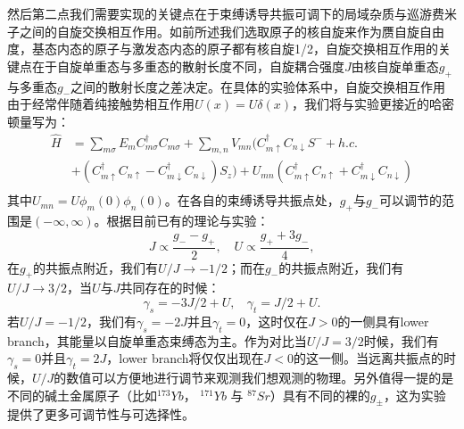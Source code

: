 然后第二点我们需要实现的关键点在于束缚诱导共振可调下的局域杂质与巡游费米子之间的自旋交换相互作用\cite{ono2019antiferromagnetic,zhang2016kondo,cheng2017enhancing,zhang2018control,ji2018confinement,zhang2020tight}。如前所述我们选取原子的核自旋来作为赝自旋自由度，基态内态的原子与激发态内态的原子都有核自旋1/2，自旋交换相互作用的关键点在于自旋单重态与多重态的散射长度不同，自旋耦合强度$J$由核自旋单重态$g_+$与多重态$g_-$之间的散射长度之差决定\cite{scazza2014observation,cappellini2014direct,ono2019antiferromagnetic}。在具体的实验体系中，自旋交换相互作用由于经常伴随着纯接触势相互作用$U(x)=U\delta(x)$，我们将与实验更接近的哈密顿量写为：
\begin{equation}
\begin{split}
     \hat{H} &= \sum_{m\sigma}E_m C_{m\sigma}^\dagger C_{m\sigma} + \sum_{m,n} V_{mn} ( C_{m\uparrow}^\dagger  C_{n\downarrow} S^- + h.c. \\
     & +   (C_{m\uparrow}^\dagger  C_{n\uparrow}-C_{m\downarrow}^\dagger  C_{n\downarrow}) S_z )+U_{mn} (C_{m\uparrow}^\dagger  C_{n\uparrow}+C_{m\downarrow}^\dagger  C_{n\downarrow})\\
\end{split}  \label{H_U}
\end{equation}
其中$U_{mn}=U\phi_m(0)\phi_n(0)$。在各自的束缚诱导共振点处，$g_+$与$g_-$可以调节的范围是$(-\infty,\infty)$。根据目前已有的理论与实验：
\begin{equation}
J \propto \frac{g_- -g_+}{2} ,\quad U \propto \frac{g_++3g_-}{4},
\end{equation}
在$g_+$的共振点附近，我们有$U/J\to-1/2$；而在$g_-$的共振点附近，我们有$U/J\to3/2$，当$U$与$J$共同存在的时候：
\begin{equation} 
\gamma_s=-3J/2+U,\ \ \ \ \gamma_t=J/2+U. \label{eff_gamma}
\end{equation}
若$U/J=-1/2$，我们有$\gamma_s=-2J$并且$\gamma_t=0$，这时仅在$J>0$的一侧具有lower branch，其能量以自旋单重态束缚态为主。作为对比当$U/J=3/2$时候，我们有$\gamma_s=0$并且$\gamma_t=2J$，lower branch将仅仅出现在$J<0$的这一侧。当远离共振点的时候，$U/J$的数值可以方便地进行调节来观测我们想观测的物理。另外值得一提的是不同的碱土金属原子（比如${}^{173}Yb$， ${}^{171}Yb$ 与 ${}^{87}Sr$）具有不同的裸的$g_{\pm}$，这为实验提供了更多可调节性与可选择性。


